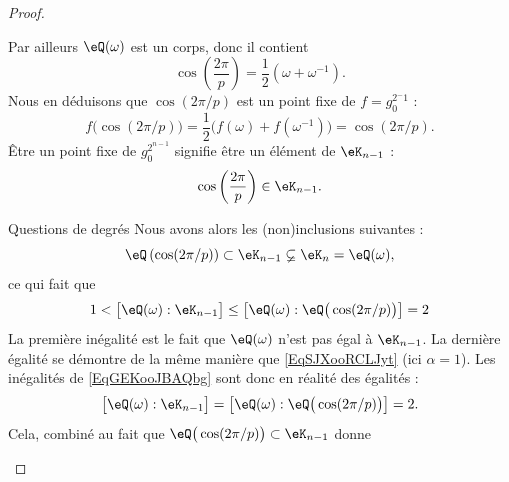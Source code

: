 \begin{proof}
\begin{subproof}
\begin{subproof}
                        Par ailleurs \( \eQ(\omega)\) est un corps, donc il contient
                        \begin{equation}
                            \cos\left( \frac{ 2\pi }{ p } \right)=\frac{ 1 }{2}(\omega+\omega^{-1}).
                        \end{equation}
                        Nous en déduisons que \( \cos(2\pi/p)\) est un point fixe de \( f=g_0^{2^-1}\) :
                        \begin{equation}
                            f\big( \cos(2\pi/p) \big)=\frac{ 1 }{2}\big( f(\omega)+f(\omega^{-1}) \big)=\cos(2\pi/p).
                        \end{equation}
                        Être un point fixe de \( g_0^{2^{n-1}}\) signifie être un élément de \( \eK_{n-1}\) :
                        \begin{equation}
                            \cos\left( \frac{ 2\pi }{ p } \right)\in \eK_{n-1}.
                        \end{equation}
                    \item[Questions de degrés]
                        Nous avons alors les (non)inclusions suivantes :
                        \begin{equation}
                            \eQ\left( \cos(2\pi/p) \right)\subset \eK_{n-1}\varsubsetneq \eK_n=\eQ(\omega),
                        \end{equation}
                        ce qui fait que
                        \begin{equation}    \label{EqGEKooJBAQbg}
                            1<\big[ \eQ(\omega):\eK_{n-1} \big]\leq\big[ \eQ(\omega):\eQ\big( \cos(2\pi/p) \big) \big]=2
                        \end{equation}
                        La première inégalité est le fait que \( \eQ(\omega)\) n'est pas égal à \( \eK_{n-1}\). La dernière égalité se démontre de la même manière que \eqref{EqSJXooRCLJyt} (ici \( \alpha=1\)). Les inégalités de \eqref{EqGEKooJBAQbg} sont donc en réalité des égalités :
                        \begin{equation}
                            \big[ \eQ(\omega):\eK_{n-1} \big]=\big[ \eQ(\omega):\eQ\big( \cos(2\pi/p) \big) \big]=2.
                        \end{equation}
                        Cela, combiné au fait que \( \eQ\big( \cos(2\pi/p) \big)\subset \eK_{n-1}\) donne
                        \begin{equation}

\end{equation}
\end{subproof}
\end{subproof}
\end{proof}
